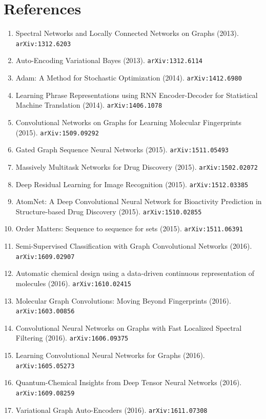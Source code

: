 \documentclass[11pt]{article}
\begin{document}
\section*{References}
\begin{enumerate}\small
  \item Spectral Networks and Locally Connected Networks on Graphs (2013). \texttt{arXiv:1312.6203}
  \item Auto-Encoding Variational Bayes (2013). \texttt{arXiv:1312.6114}
  \item Adam: A Method for Stochastic Optimization (2014). \texttt{arXiv:1412.6980}
  \item Learning Phrase Representations using RNN Encoder-Decoder for
  Statistical Machine Translation (2014). \texttt{arXiv:1406.1078}
  \item Convolutional Networks on Graphs for Learning Molecular Fingerprints (2015). \texttt{arXiv:1509.09292}
  \item Gated Graph Sequence Neural Networks (2015). \texttt{arXiv:1511.05493}
  \item Massively Multitask Networks for Drug Discovery (2015). \texttt{arXiv:1502.02072}
  \item Deep Residual Learning for Image Recognition (2015). \texttt{arXiv:1512.03385}
  \item AtomNet: A Deep Convolutional Neural Network for Bioactivity Prediction
  in Structure-based Drug Discovery (2015). \texttt{arXiv:1510.02855}
  \item Order Matters: Sequence to sequence for sets (2015). \texttt{arXiv:1511.06391}
  \item Semi-Supervised Classification with Graph Convolutional Networks (2016). \texttt{arXiv:1609.02907}
  \item Automatic chemical design using a data-driven continuous representation
  of molecules (2016). \texttt{arXiv:1610.02415}
  \item Molecular Graph Convolutions: Moving Beyond Fingerprints (2016). \texttt{arXiv:1603.00856}
  \item Convolutional Neural Networks on Graphs with Fast Localized Spectral
  Filtering (2016). \texttt{arXiv:1606.09375}
  \item Learning Convolutional Neural Networks for Graphs (2016). \texttt{arXiv:1605.05273}
  \item Quantum-Chemical Insights from Deep Tensor Neural Networks (2016). \texttt{arXiv:1609.08259}
  \item Variational Graph Auto-Encoders (2016). \texttt{arXiv:1611.07308}

\end{enumerate}
\end{document}

